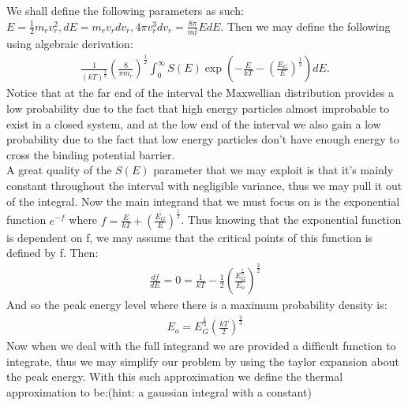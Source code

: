 \documentclass[11pt]{article}
\theoremstyle{quest}
\begin{document}
We shall define the following parameters as such: $E = \frac{1}{2} m_r v_r^2, dE = m_r v_r dv_r, 4\pi v_r^3 dv_r = \frac{8\pi}{m_r^2} EdE$. Then we may define the following using algebraic derivation:
\begin{align}
\frac{1}{(kT)^{\frac{3}{2}}} (\frac{8}{\pi m_r})^{\frac{1}{2}} \int_{0}^{\infty} S(E) \exp(-\frac{E}{kT} - (\frac{E_G}{E})^{\frac{1}{2}}) dE.
\end{align}
Notice that at the far end of the interval the Maxwellian distribution provides a low probability due to the fact that high energy particles almost improbable to exist in a closed system, and at the low end of the interval we also gain a low probability due to the fact that low energy particles don't have enough energy to cross the binding potential barrier.\\
A great quality of the $S(E)$ parameter that we may exploit is that it's mainly constant throughout the interval with negligible variance, thus we may pull it out of the integral. Now the main integrand that we must focus on is the exponential function $e^{-f}$ where $f = \frac{E}{kT} + (\frac{E_G}{E})^{\frac{1}{2}}$. Thus knowing that the exponential function is dependent on f, we may assume that the critical points of this function is defined by f. Then:
\begin{align*}
\frac{df}{dE} = 0 = \frac{1}{kT} - \frac{1}{2}(\frac{E_G^\frac{1}{3}}{E_o})^{\frac{3}{2}}
\end{align*}
And so the peak energy level where there is a maximum probability density is: \begin{align}
E_o = E_G^{\frac{1}{3}}(\frac{kT}{2})^{\frac{2}{3}}
\end{align}
Now when we deal with the full integrand we are provided a difficult function to integrate, thus we may simplify our problem by using the taylor expansion about the peak energy. With this such approximation we define the thermal approximation to be:(hint: a gaussian integral with a constant)
\end{document}
